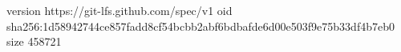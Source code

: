 version https://git-lfs.github.com/spec/v1
oid sha256:1d58942744ce857fadd8cf54bcbb2abf6bdbafde6d00e503f9e75b33df4b7eb0
size 458721
